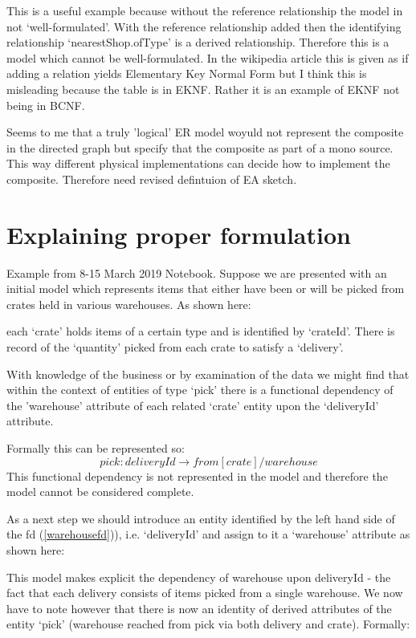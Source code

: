 \documentclass[10pt,a4paper]{scrartcl}
\renewcommand{\erpictureFolder}[0]{../SharedPictures}
\begin{document}
\begin{center}

\end{center}

This is a useful example because without the reference relationship the model in not `well-formulated'. With the reference relationship added
then the identifying relationship `nearestShop.ofType' is a derived relationship. Therefore this is a model which cannot be well-formulated.
In the wikipedia article this is given as if adding a relation yields Elementary Key Normal Form but I think this is misleading because 
the table is in EKNF. Rather it is an example of EKNF not being in BCNF.

Seems to me that a truly 'logical' ER model woyuld not represent the composite in the directed graph but specify that the composite as part of a mono source. This way different physical implementations can decide how to implement the composite. Therefore need revised defintuion of EA sketch.




\section{Explaining proper formulation}
Example from 8-15 March 2019 Notebook.
Suppose we are presented with an  initial model which represents items that either have been or will be picked from crates held in various warehouses.
As shown here:
\begin{center}

\end{center}
each `crate' holds items of a certain type and is identified by `crateId'. There is record of 
the `quantity' picked from each crate to satisfy a `delivery'.  

With knowledge of the business or by examination of the data we might find that  within the context 
of entities of type `pick' there is a functional dependency of the 'warehouse' attribute of each  related `crate' entity upon the `deliveryId' attribute.

Formally this can be represented so:
\begin{equation}
\label{warehousefd}
pick: deliveryId \longrightarrow  from[crate]/warehouse
\end{equation}
This functional dependency is not represented in the model and therefore the model cannot be 
considered complete.

As a next step we should introduce an entity identified by the left hand side 
of the fd (\ref{warehousefd})), i.e.
 `deliveryId' and assign to it a `warehouse' attribute as shown here:
\begin{center}

\end{center}
This model makes explicit the dependency of warehouse upon deliveryId - the fact that each delivery consists of items picked from a single warehouse. We now have to note however that there is now
an identity of derived attributes of the entity `pick' (warehouse reached from pick via both delivery and crate). Formally:
\end{document}

